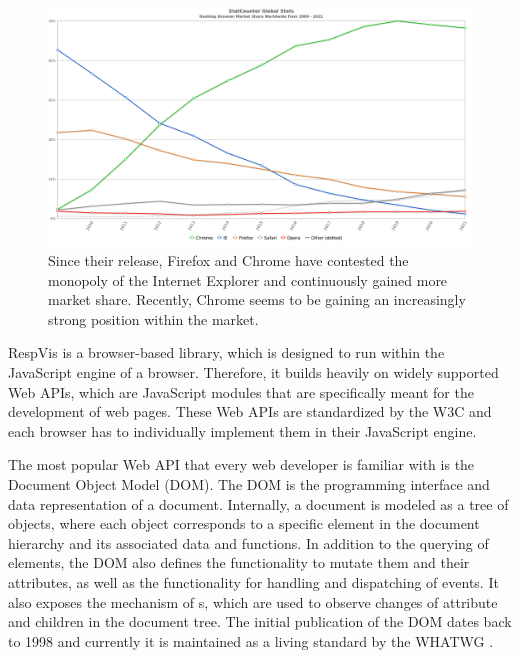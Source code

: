 \begin{figure}[tp]
\centering
\includegraphics[keepaspectratio,width=\linewidth,height=\fullh / 2]{images/browser-market-share.png}
\caption[Desktop Browser Market Share]{
  Since their release, Firefox and Chrome have contested the monopoly of the Internet Explorer and continuously gained more market share. 
  Recently, Chrome seems to be gaining an increasingly strong position within the market. 
  }
\label{fig:BrowserMarketShare}
\end{figure}

RespVis is a browser-based library, which is designed to run within the JavaScript engine of a browser. 
Therefore, it builds heavily on widely supported Web APIs, which are JavaScript modules that are specifically meant for the development of web pages. 
These Web APIs are standardized by the W3C and each browser has to individually implement them in their JavaScript engine.

The most popular Web API that every web developer is familiar with is the Document Object Model (DOM). 
The DOM is the programming interface and data representation of a document. 
Internally, a document is modeled as a tree of objects, where each object corresponds to a specific element in the document hierarchy and its associated data and functions. 
In addition to the querying of elements, the DOM also defines the functionality to mutate them and their attributes, as well as the functionality for handling and dispatching of events. 
It also exposes the mechanism of s, which are used to observe changes of attribute and children in the document tree. 
The initial publication of the DOM dates back to 1998 \parencite{DOM1} and currently it is maintained as a living standard by the WHATWG \parencite{DOM}.

